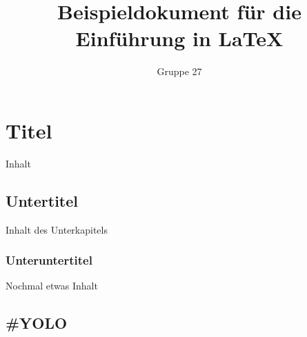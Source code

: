 \documentclass[a4paper,10pt,fleqn]{article}
\title{Beispieldokument für die Einführung in \LaTeX}
\author{Gruppe 27}
\begin{document}
\maketitle
\clearpage
\tableofcontents
\clearpage

\section{Titel}
Inhalt

\subsection{Untertitel}
Inhalt des Unterkapitels

\subsubsection{Unteruntertitel}
Nochmal etwas Inhalt

\subsection{ #YOLO }



\end{document}
